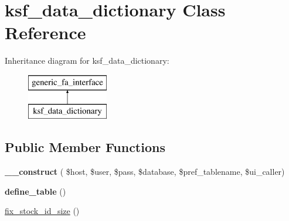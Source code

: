 \hypertarget{classksf__data__dictionary}{}\section{ksf\+\_\+data\+\_\+dictionary Class Reference}
\label{classksf__data__dictionary}
Inheritance diagram for ksf\+\_\+data\+\_\+dictionary\+:\begin{figure}[H]
\begin{center}
\leavevmode
\includegraphics[height=2.000000cm]{d4/d83/classksf__data__dictionary}
\end{center}
\end{figure}
\subsection*{Public Member Functions}
\begin{DoxyCompactItemize}
\item 
\hypertarget{classksf__data__dictionary_acb25c29a1061b3a6d9e30c06fbb2c10e}{}\label{classksf__data__dictionary_acb25c29a1061b3a6d9e30c06fbb2c10e} 
{\bfseries \+\_\+\+\_\+construct} ( \$host, \$user, \$pass, \$database, \$pref\+\_\+tablename, \$ui\+\_\+caller)
\item 
\hypertarget{classksf__data__dictionary_a7c16a24545d7b021f36cbe8db1960240}{}\label{classksf__data__dictionary_a7c16a24545d7b021f36cbe8db1960240} 
{\bfseries define\+\_\+table} ()
\item 
\hyperlink{classksf__data__dictionary_af5a8a952ccf5cf307449559a8c0219b3}{fix\+\_\+stock\+\_\+id\+\_\+size} ()
\end{DoxyCompactItemize}
